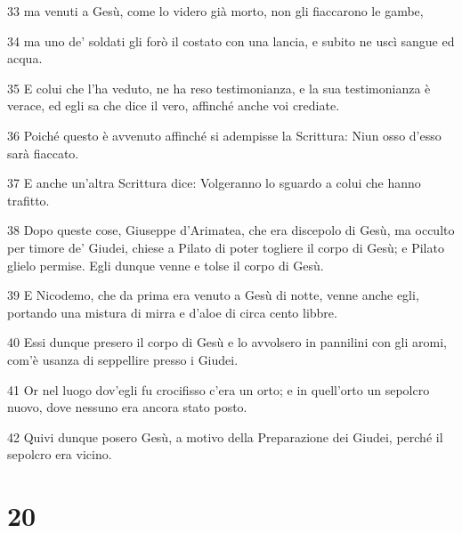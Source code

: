\par 33 ma venuti a Gesù, come lo videro già morto, non gli fiaccarono le gambe,
\par 34 ma uno de' soldati gli forò il costato con una lancia, e subito ne uscì sangue ed acqua.
\par 35 E colui che l'ha veduto, ne ha reso testimonianza, e la sua testimonianza è verace, ed egli sa che dice il vero, affinché anche voi crediate.
\par 36 Poiché questo è avvenuto affinché si adempisse la Scrittura: Niun osso d'esso sarà fiaccato.
\par 37 E anche un'altra Scrittura dice: Volgeranno lo sguardo a colui che hanno trafitto.
\par 38 Dopo queste cose, Giuseppe d'Arimatea, che era discepolo di Gesù, ma occulto per timore de' Giudei, chiese a Pilato di poter togliere il corpo di Gesù; e Pilato glielo permise. Egli dunque venne e tolse il corpo di Gesù.
\par 39 E Nicodemo, che da prima era venuto a Gesù di notte, venne anche egli, portando una mistura di mirra e d'aloe di circa cento libbre.
\par 40 Essi dunque presero il corpo di Gesù e lo avvolsero in pannilini con gli aromi, com'è usanza di seppellire presso i Giudei.
\par 41 Or nel luogo dov'egli fu crocifisso c'era un orto; e in quell'orto un sepolcro nuovo, dove nessuno era ancora stato posto.
\par 42 Quivi dunque posero Gesù, a motivo della Preparazione dei Giudei, perché il sepolcro era vicino.

\chapter{20}

